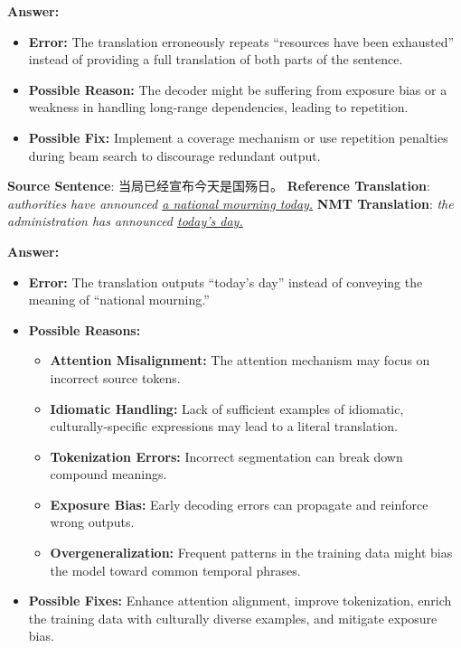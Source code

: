 \begin{parts}
\begin{subparts}
        {\color{red}
            \textbf{Answer:}
            \begin{itemize}
                \item \textbf{Error:} The translation erroneously repeats “resources have been exhausted” instead of providing a full translation of both parts of the sentence.
                \item \textbf{Possible Reason:} The decoder might be suffering from exposure bias or a weakness in handling long-range dependencies, leading to repetition.
                \item \textbf{Possible Fix:} Implement a coverage mechanism or use repetition penalties during beam search to discourage redundant output.
            \end{itemize}
        }

        \subpart[2]
        \textbf{Source Sentence}: 当局已经宣布今天是国殇日。 \newline
        \textbf{Reference Translation}: \textit{authorities have announced \underline{a national mourning today.}}\newline
        \textbf{NMT Translation}: \textit{the administration has announced \underline{today's day.}}
        
        {\color{red}
            \textbf{Answer:}
            \begin{itemize}
                \item \textbf{Error:} The translation outputs “today’s day” instead of conveying the meaning of “national mourning.”
                \item \textbf{Possible Reasons:}
                \begin{itemize}
                    \item \textbf{Attention Misalignment:} The attention mechanism may focus on incorrect source tokens.
                    \item \textbf{Idiomatic Handling:} Lack of sufficient examples of idiomatic, culturally-specific expressions may lead to a literal translation.
                    \item \textbf{Tokenization Errors:} Incorrect segmentation can break down compound meanings.
                    \item \textbf{Exposure Bias:} Early decoding errors can propagate and reinforce wrong outputs.
                    \item \textbf{Overgeneralization:} Frequent patterns in the training data might bias the model toward common temporal phrases.
                \end{itemize}
                \item \textbf{Possible Fixes:} Enhance attention alignment, improve tokenization, enrich the training data with culturally diverse examples, and mitigate exposure bias.
            \end{itemize}
        }
        

\end{subparts}
\end{parts}

